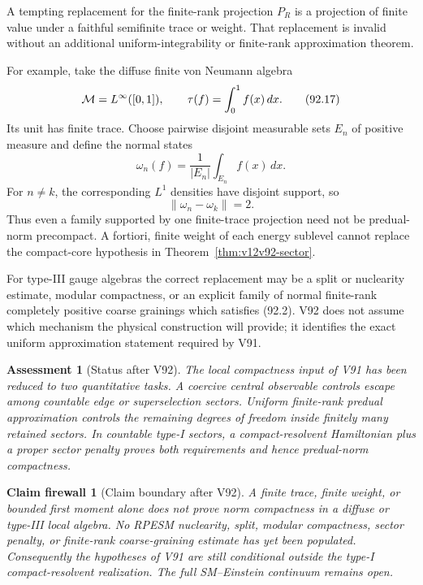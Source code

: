 \documentclass[11pt]{article}
\newtheorem{firewall}[theorem]{Claim firewall}
\newtheorem{assessment}[theorem]{Assessment}
\theoremstyle{remark}
\begin{document}
A tempting replacement for the finite-rank projection \(P_R\) is a
projection of finite value under a faithful semifinite trace or
weight.  That replacement is invalid without an additional
uniform-integrability or finite-rank approximation theorem.

For example, take the diffuse finite von Neumann algebra
\[
 {\cal M}=L^\infty([0,1]),\qquad
 \tau(f)=\int_0^1 f(x)\,dx.                                     \tag{92.17}
\]
Its unit has finite trace.  Choose pairwise disjoint measurable
sets \(E_n\) of positive measure and define the normal states
\[
 \omega_n(f)=\frac{1}{|E_n|}\int_{E_n}f(x)\,dx.                  \tag{92.18}
\]
For \(n\neq k\), the corresponding \(L^1\) densities have disjoint
support, so
\[
 \|\omega_n-\omega_k\|=2.                                       \tag{92.19}
\]
Thus even a family supported by one finite-trace projection need
not be predual-norm precompact.  A fortiori, finite weight of each
energy sublevel cannot replace the compact-core hypothesis in
Theorem~\ref{thm:v12v92-sector}.

For type-III gauge algebras the correct replacement may be a split
or nuclearity estimate, modular compactness, or an explicit family
of normal finite-rank completely positive coarse grainings which
satisfies (92.2).  V92 does not assume which mechanism the physical
construction will provide; it identifies the exact uniform
approximation statement required by V91.

\begin{assessment}[Status after V92]
\label{ass:v12v92-status}
The local compactness input of V91 has been reduced to two
quantitative tasks.  A coercive central observable controls escape
among countable edge or superselection sectors.  Uniform finite-rank
predual approximation controls the remaining degrees of freedom
inside finitely many retained sectors.  In countable type-I sectors,
a compact-resolvent Hamiltonian plus a proper sector penalty proves
both requirements and hence predual-norm compactness.
\end{assessment}

\begin{firewall}[Claim boundary after V92]
\label{fire:v12v92-claim}
A finite trace, finite weight, or bounded first moment alone does not
prove norm compactness in a diffuse or type-III local algebra.  No
RPESM nuclearity, split, modular compactness, sector penalty, or
finite-rank coarse-graining estimate has yet been populated.
Consequently the hypotheses of V91 are still conditional outside
the type-I compact-resolvent realization.  The full SM--Einstein
continuum remains open.
\end{firewall}
\end{document}
